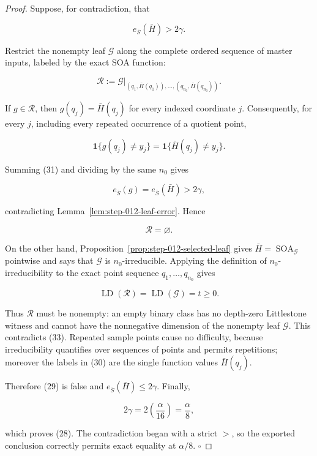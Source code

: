 \begin{proof}
Suppose, for contradiction, that

\[
 e_{\bar S}(\bar H)>2\gamma.
\tag{29}
\]

Restrict the nonempty leaf \(\mathcal G\) along the complete ordered
sequence of master inputs, labeled by the exact SOA function:

\[
 \mathcal R
 :=\mathcal G|_{(q_1,\bar H(q_1)),\ldots,
                       (q_{n_0},\bar H(q_{n_0}))}.
\tag{30}
\]

If \(g\in\mathcal R\), then
\(g(q_j)=\bar H(q_j)\) for every indexed coordinate \(j\). Consequently,
for every \(j\), including every repeated occurrence of a quotient point,

\[
 \mathbf1\{g(q_j)\ne y_j\}
 =\mathbf1\{\bar H(q_j)\ne y_j\}.
\tag{31}
\]

Summing (31) and dividing by the same \(n_0\) gives

\[
 e_{\bar S}(g)=e_{\bar S}(\bar H)>2\gamma,
\tag{32}
\]

contradicting Lemma~\ref{lem:step-012-leaf-error}. Hence

\[
 \mathcal R=\varnothing.
\tag{33}
\]

On the other hand, Proposition~\ref{prop:step-012-selected-leaf} gives
\(\bar H=\operatorname{SOA}_{\mathcal G}\) pointwise and says that
\(\mathcal G\) is \(n_0\)-irreducible. Applying the definition of
\(n_0\)-irreducibility to the exact point sequence
\(q_1,\ldots,q_{n_0}\) gives

\[
 \operatorname{LD}(\mathcal R)
 =\operatorname{LD}(\mathcal G)=t\ge0.
\tag{34}
\]

Thus \(\mathcal R\) must be nonempty: an empty binary class has no
depth-zero Littlestone witness and cannot have the nonnegative dimension
of the nonempty leaf \(\mathcal G\). This contradicts (33). Repeated
sample points cause no difficulty, because irreducibility quantifies over
sequences of points and permits repetitions; moreover the labels in (30)
are the single function values \(\bar H(q_j)\).

Therefore (29) is false and \(e_{\bar S}(\bar H)\le2\gamma\). Finally,

\[
 2\gamma=2\left(\frac{\alpha}{16}\right)=\frac{\alpha}{8},
\tag{35}
\]

which proves (28). The contradiction began with a strict \(>\), so the
exported conclusion correctly permits exact equality at
\(\alpha/8\). \(\square\)


\end{proof}

